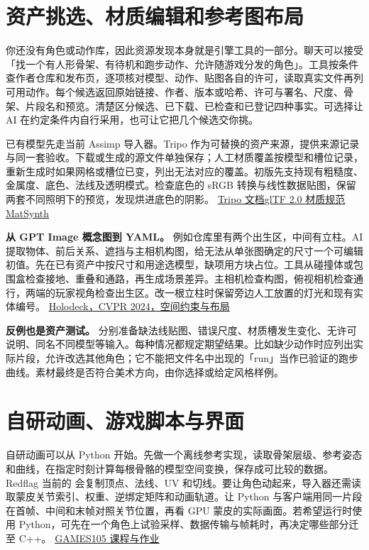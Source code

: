 \documentclass[UTF8,11pt,fontset=fandol,a4paper]{ctexart}
\newcommand{\src}[2]{\href{#1}{#2}}
\newcommand{\f}[1]{\texttt{\detokenize{#1}}}
\newcommand{\pg}[1]{\clearpage\section{#1}}
\begin{document}
\pg{资产挑选、材质编辑和参考图布局}
你还没有角色或动作库，因此资源发现本身就是引擎工具的一部分。聊天可以接受「找一个有人形骨架、有待机和跑步动作、允许随游戏分发的角色」。工具按条件查作者仓库和发布页，逐项核对模型、动作、贴图各自的许可，读取真实文件再列可用动作。每个候选返回原始链接、作者、版本或哈希、许可与署名、尺度、骨架、片段名和预览。清楚区分候选、已下载、已检查和已登记四种事实。可选择让 AI 在约定条件内自行采用，也可让它把几个候选交你挑。

已有模型先走当前 Assimp 导入器。Tripo 作为可替换的资产来源，提供来源记录与同一套验收。下载或生成的源文件单独保存；人工材质覆盖按模型和槽位记录，重新生成时如果网格或槽位已变，列出无法对应的覆盖。初版先支持现有粗糙度、金属度、底色、法线及透明模式。检查底色的 sRGB 转换与线性数据贴图，保留两套不同照明下的预览，发现烘进底色的阴影。 \src{https://www.tripo3d.ai/product-doc/module-post-processing/rigging-animation}{Tripo 文档}\quad \src{https://registry.khronos.org/glTF/specs/2.0/glTF-2.0.html}{glTF 2.0 材质规范}\quad \src{https://research.adobe.com/publication/matsynth-a-modern-pbr-materials-dataset/}{MatSynth}

\textbf{从 GPT Image 概念图到 YAML。} 例如仓库里有两个出生区，中间有立柱。AI 提取物体、前后关系、遮挡与主相机构图，给无法从单张图确定的尺寸一个可编辑初值。先在已有资产中按尺寸和用途选模型，缺项用方块占位。工具从碰撞体或包围盒检查接地、重叠和通路，再生成场景差异。主相机检查构图，俯视相机检查通行，两端的玩家视角检查出生区。改一根立柱时保留旁边人工放置的灯光和现有实体编号。 \src{https://openaccess.thecvf.com/content/CVPR2024/html/Yang_Holodeck_Language_Guided_Generation_of_3D_Embodied_AI_Environments_CVPR_2024_paper.html}{Holodeck，CVPR 2024，空间约束与布局}

\textbf{反例也是资产测试。} 分别准备缺法线贴图、错误尺度、材质槽发生变化、无许可说明、同名不同模型等输入。每种情况都规定期望结果。比如缺少动作时应列出实际片段，允许改选其他角色；它不能把文件名中出现的「run」当作已验证的跑步曲线。素材最终是否符合美术方向，由你选择或给定风格样例。

\pg{自研动画、游戏脚本与界面}
自研动画可以从 Python 开始。先做一个离线参考实现，读取骨架层级、参考姿态和曲线，在指定时刻计算每根骨骼的模型空间变换，保存成可比较的数据。Redflag 当前的 \f{Model::ProcessMesh} 会复制顶点、法线、UV 和切线。要让角色动起来，导入器还需读取蒙皮关节索引、权重、逆绑定矩阵和动画轨道。让 Python 与客户端用同一片段在首帧、中间和末帧对照关节位置，再看 GPU 蒙皮的实际画面。若希望运行时使用 Python，可先在一个角色上试验采样、数据传输与帧耗时，再决定哪些部分迁至 C++。 \src{https://games-105.github.io/}{GAMES105 课程与作业}
\end{document}
